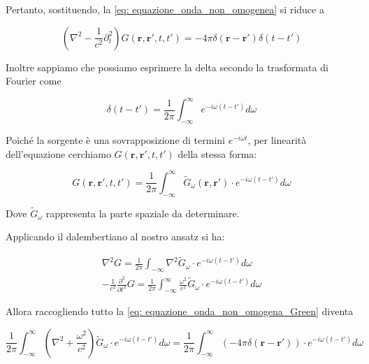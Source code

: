Pertanto, sostituendo, la \ref{eq: equazione_onda_non_omogenea} si riduce a 

\begin{tcolorbox}[colback=yellow!10!white, colframe=orange!70!black, boxrule=0.8pt]
\begin{equation} \label{eq: equazione_onda_non_omogena_Green}
    (\nabla^2 - \frac{1}{c^2} \partial_t^2) G(\mathbf{r}, \mathbf{r'}, t, t') = -4 \pi \delta(\mathbf{r} - \mathbf{r'})\delta (t - t') 
\end{equation}
\end{tcolorbox}

Inoltre sappiamo che possiamo esprimere la delta secondo la trasformata di Fourier come 

\begin{equation}
    \delta(t - t') = \frac{1}{2\pi} \int_{-\infty}^{\infty} e^{-i \omega (t-t')} d\omega
\end{equation}

Poiché la sorgente è una sovrapposizione di termini $e^{-i\omega t}$, per linearità dell'equazione cerchiamo $G(\mathbf{r}, \mathbf{r'}, t, t')$ della stessa forma:

\begin{tcolorbox}[colback=yellow!10!white, colframe=orange!70!black, boxrule=0.8pt]
\begin{equation} \label{eq: legame_Green_tempo_spazio}
    G(\mathbf{r}, \mathbf{r'}, t, t') = \frac{1}{2\pi} \int_{-\infty}^{\infty} \tilde{G}_{\omega}(\mathbf{r}, \mathbf{r'}) \cdot e^{-i \omega (t -t')} d\omega
\end{equation}
\end{tcolorbox}

Dove $\tilde{G}_{\omega}$ rappresenta la parte spaziale da determinare. 

\newpage

Applicando il dalembertiano al nostro ansatz si ha:

\begin{align}
    \nabla^2 G = \frac{1}{2\pi} \int_{-\infty} \nabla^2 \tilde{G}_{\omega} \cdot e^{-i \omega (t-t')} d\omega\\
    -\frac{1}{c^2} \frac{\partial^2}{\partial t^2} G = \frac{1}{2\pi} \int_{-\infty}^{\infty} \frac{\omega^2}{c^2} \tilde{G}_{\omega} \cdot e^{-i \omega (t - t')} d \omega
\end{align}

Allora raccogliendo tutto la \ref{eq: equazione_onda_non_omogena_Green} diventa 

\begin{equation}
\frac{1}{2\pi} \int_{-\infty}^{\infty} \left( \nabla^2 + \frac{\omega^2}{c^2} \right) \tilde{G}_{\omega} \cdot e^{-i\omega (t-t')} d\omega = \frac{1}{2\pi} \int_{-\infty}^{\infty} \left( -4\pi \delta(\mathbf{r} - \mathbf{r'}) \right) \cdot e^{-i\omega (t-t')} d\omega
\end{equation}

